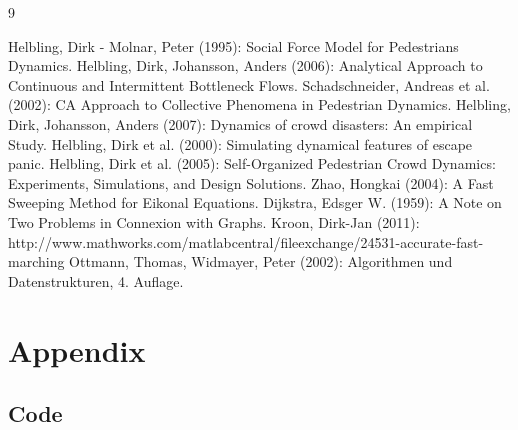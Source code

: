 \documentclass[11pt]{article}
\begin{document}
\begin{thebibliography} {9}
	
	 Helbling, Dirk - Molnar, Peter (1995): Social Force Model for Pedestrians Dynamics.
	 Helbling, Dirk, Johansson, Anders (2006): Analytical Approach to Continuous and Intermittent Bottleneck Flows.
	 Schadschneider, Andreas et al. (2002): CA Approach to Collective Phenomena in Pedestrian Dynamics.	
	 Helbling, Dirk, Johansson, Anders (2007): Dynamics of crowd disasters: An empirical Study.
	 Helbling, Dirk et al. (2000): Simulating dynamical features of escape panic.
	 Helbling, Dirk et al. (2005): Self-Organized Pedestrian Crowd Dynamics: Experiments, Simulations, and Design Solutions.
	 Zhao, Hongkai (2004): A Fast Sweeping Method for Eikonal Equations.
	 Dijkstra, Edsger W. (1959): A Note on Two Problems in Connexion with Graphs.
	 Kroon, Dirk-Jan (2011): http://www.mathworks.com/matlabcentral/fileexchange/24531-accurate-fast-marching
	 Ottmann, Thomas, Widmayer, Peter (2002): Algorithmen und Datenstrukturen, 4. Auflage.

\end{thebibliography}


\section{Appendix}

\subsection{Code}

\lstset{language=Matlab,breaklines=true}



















\end{document}
